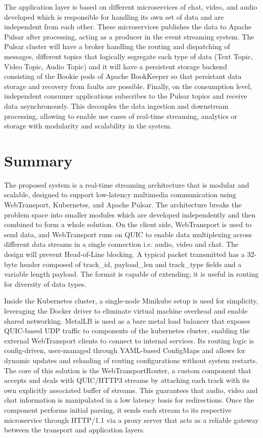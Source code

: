 {The application layer is based on different microservices of chat, video, and audio developed which is responsible for handling its own set of data and are independent from each other. These microservices publishes the data to Apache Pulsar after processing, acting as a producer in the event streaming system. The Pulsar cluster will have a broker handling the routing and dispatching of messages, different topics that logically segregate each type of data (Text Topic, Video Topic, Audio Topic) and it will have a persistent storage backend consisting of the Bookie pods of Apache BookKeeper so that persistant data storage and recovery from faults are possible. Finally, on the consumption level, independent consumer applications subscribes to the Pulsar topics and receive data asynchronously. This decouples the data ingestion and downstream processing, allowing to enable use cases of real-time streaming, analytics or storage with modularity and scalability in the system.
\label{sec:OverviewOfDesign}

\section {Summary}
The proposed system is a real-time streaming architecture that is modular and scalable, designed to support low-latency multimedia communication using WebTransport, Kubernetes, and Apache Pulsar. The architecture breaks the problem space into smaller modules which are developed independently and then combined to form a whole solution. On the client side, WebTransport is used to send data, and WebTransport runs on QUIC to enable data multiplexing across different data streams in a single connection i.e. audio, video and chat. The design will prevent Head-of-Line blocking. A typical packet transmitted has a 32-byte header composed of track\_id, payload\_len and track\_type fields and a variable length payload. The format is capable of extending; it is useful in routing for diversity of data types.

Inside the Kubernetes cluster, a single-node Minikube setup is used for simplicity, leveraging the Docker driver to eliminate virtual machine overhead and enable shared networking. MetalLB is used as a bare metal load balancer that exposes QUIC-based UDP traffic to components of the kubernetes cluster, enabling the external WebTransport clients to connect to internal services. Its routing logic is config-driven, user-managed through YAML-based ConfigMaps and allows for dynamic updates and reloading of routing configurations without system restarts. The core of this solution is the WebTransportRouter, a custom component that accepts and deals with QUIC/HTTP3 streams by attaching each track with its own explicitly associated buffer of streams. This guarantees that audio, video and chat information is manipulated in a low latency basis for redirections. Once the component performs initial parsing, it sends each stream to its respective microservice through HTTP/1.1 via a proxy server that acts as a reliable gateway between the transport and application layers.

}
